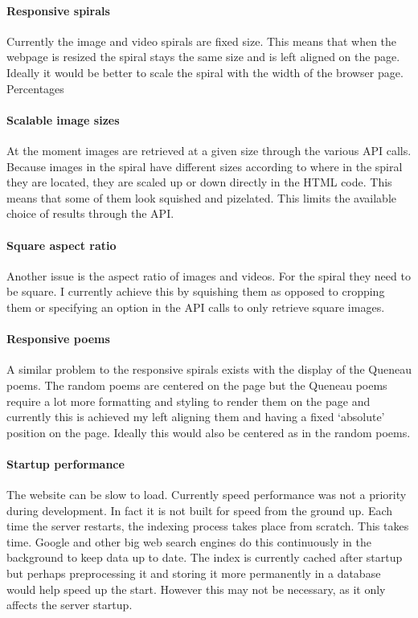 \paragraph{Responsive spirals} 
Currently the image and video spirals are fixed size. This means that when the webpage is resized the spiral stays the same size and is left aligned on the page. Ideally it would be better to scale the spiral with the width of the browser page. Percentages

\paragraph{Scalable image sizes} 
At the moment images are retrieved at a given size through the various \ac{API} calls. Because images in the spiral have different sizes according to where in the spiral they are located, they are scaled up or down directly in the \ac{HTML} code. This means that some of them look squished and pizelated. This limits the available choice of results through the API.

\paragraph{Square aspect ratio} 
Another issue is the aspect ratio of images and videos. For the spiral they need to be square. I currently achieve this by squishing them as opposed to cropping them or specifying an option in the \ac{API} calls to only retrieve square images.

\paragraph{Responsive poems} 
A similar problem to the responsive spirals exists with the display of the Queneau poems. The random poems are centered on the page but the Queneau poems require a lot more formatting and styling to render them on the page and currently this is achieved my left aligning them and having a fixed `absolute' position on the page. Ideally this would also be centered as in the random poems. 

\paragraph{Startup performance} 
The website can be slow to load. Currently speed performance was not a priority during development. In fact it is not built for speed from the ground up. Each time the server restarts, the indexing process takes place from scratch. This takes time. Google and other big web search engines do this continuously in the background to keep data up to date. The index is currently cached after startup but perhaps preprocessing it and storing it more permanently in a database would help speed up the start. However this may not be necessary, as it only affects the server startup.


